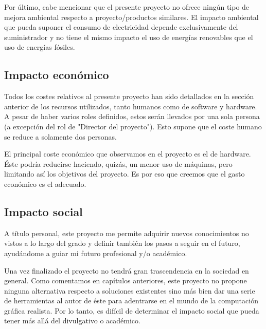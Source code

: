 \documentclass[titlepage,12pt]{report}
\begin{document}
Por último, cabe mencionar que el presente proyecto no ofrece ningún tipo de mejora ambiental respecto a proyecto/productos similares. El impacto ambiental que pueda suponer el consumo de electricidad depende exclusivamente del suministrador y no tiene el mismo impacto el uso de energías renovables que el uso de energías fósiles.

\subsection{Impacto económico}

Todos los costes relativos al presente proyecto han sido detallados en la sección anterior de los recursos utilizados, tanto humanos como de software y hardware. A pesar de haber varios roles definidos, estos serán llevados por una sola persona (a excepción del rol de "Director del proyecto"). Esto supone que el coste humano se reduce a solamente dos personas. 

El principal coste económico que observamos en el proyecto es el de hardware. Éste podría reducirse haciendo, quizás, un menor uso de máquinas, pero limitando así los objetivos del proyecto. Es por eso que creemos que el gasto económico es el adecuado.

\subsection{Impacto social}

A título personal, este proyecto me permite adquirir nuevos conocimientos no vistos a lo largo del grado y definir también los pasos a seguir en el futuro, ayudándome a guiar mi futuro profesional y/o académico.

Una vez finalizado el proyecto no tendrá gran trascendencia en la sociedad en general. Como comentamos en capítulos anteriores, este proyecto no propone ninguna alternativa respecto a soluciones existentes sino más bien dar una serie de herramientas al autor de éste para adentrarse en el mundo de la computación gráfica realista. Por lo tanto, es difícil de determinar el impacto social que pueda tener más allá del divulgativo o académico.

\newpage
\nocite{*}

\printbibliography
\end{document}
